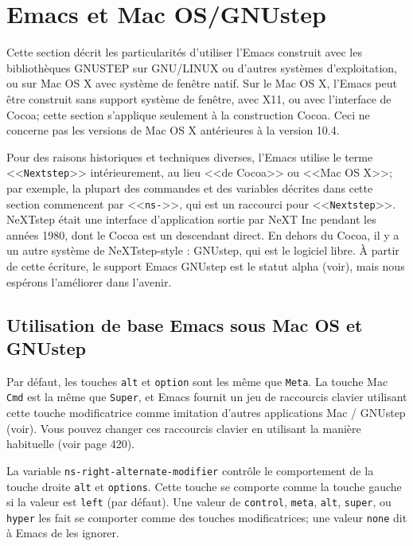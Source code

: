 \chapter{Emacs et Mac OS/GNUstep}\label{appF}

Cette section décrit les particularités d'utiliser l'Emacs construit
avec les bibliothèques GNUSTEP sur GNU/LINUX ou d'autres systèmes
d'exploitation, ou sur Mac OS X avec système de fenêtre natif. Sur le
Mac OS X, l'Emacs peut être construit sans support système de fenêtre,
avec X11, ou avec l'interface de Cocoa; cette section s'applique
seulement à la construction Cocoa. Ceci ne concerne  pas les
versions de Mac OS X antérieures à la version 10.4.

Pour des raisons historiques et techniques diverses, l'Emacs utilise
le terme <<\texttt{Nextstep}>> intérieurement, au lieu <<de Cocoa>> ou <<Mac OS
X>>; par exemple, la plupart des commandes et des variables décrites
dans cette section commencent par <<\texttt{ns-}>>, qui est un raccourci pour 
<<\texttt{Nextstep}>>. NeXTstep était une interface d'application
sortie par NeXT Inc pendant les années 1980, dont le Cocoa est un
descendant direct. En dehors du Cocoa, il y a un autre système de
NeXTstep-style : GNUstep, qui est le logiciel libre. À partir de cette
écriture, le support Emacs GNUstep est le statut alpha
(voir), mais nous espérons l'améliorer dans l'avenir.

\section{Utilisation de base Emacs sous Mac OS et
  GNUstep}\label{appFsec1} 

Par défaut, les touches \texttt{alt} et \texttt{option} sont les même
que \texttt{Meta}. La touche Mac \texttt{Cmd} est la même que
  \texttt{Super}, et Emacs fournit un jeu de raccourcis clavier
  utilisant cette touche modificatrice comme imitation d'autres
  applications Mac / GNUstep (voir). Vous pouvez changer ces
  raccourcis clavier en utilisant la manière habituelle (voir page
  420).

La variable \texttt{ns-right-alternate-modifier} contrôle le
comportement de la touche droite \texttt{alt} et
\texttt{options}. Cette touche se comporte comme la touche gauche si
la valeur est \texttt{left} (par défaut). Une valeur de
\texttt{control}, \texttt{meta}, \texttt{alt}, \texttt{super}, ou
\texttt{hyper} les fait se comporter comme des touches modificatrices;
une valeur \texttt{none} dit à Emacs de les ignorer.

